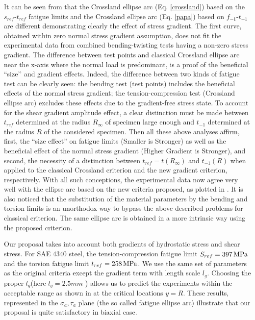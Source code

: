 It can be seen from  that the Crossland ellipse arc (Eq. \ref{crossland}) based on the $s_{ref}$-$ t_{ref}$ fatigue limits and the Crossland ellipse arc (Eq. \ref{papa}) based on $f_{-1}$-$t_{-1}$ are different demonstrating clearly the effect of stress gradient. The first curve, obtained within zero normal stress gradient assumption, does not fit the experimental data from combined bending-twisting tests having a non-zero stress gradient.  The difference between test points and classical Crossland ellipse arc near the x-axis where the normal load is predominant, is a proof of the beneficial ``size’’ and gradient effects. Indeed, the difference between two kinds of fatigue test can be clearly seen: the bending test (test points) includes the beneficial effects of the normal stress gradient; the tension-compression test (Crossland ellipse arc) excludes these effects due to the gradient-free stress state.  To account for the shear gradient amplitude effect, a clear distinction must be made between $t_{ref}$
determined at the radius $R_{\infty}$ of specimen large enough and $t_{-1}$ determined at the radius $R$ of the considered specimen.
Then all these above analyses affirm, first, the ``size effect'' on fatigue limits
(Smaller is Stronger) as well as the beneficial effect of the normal
stress gradient (Higher Gradient is Stronger), and second, the
necessity of a distinction between $t_{ref}=t(R_{\infty})$ and $t_{-1}(R)$ when applied to the classical Crossland criterion and the new gradient criterion, respectively. With all such conceptions, the experimental data now agree very well with the ellipse arc based on  the new criteria proposed, as plotted in . It is also noticed that the substitution of the material parameters by the bending and torsion limits is an unorthodox way to bypass the above described problems for classical criterion. The same ellipse arc is obtained in a more intrinsic way using the proposed criterion.

Our proposal takes into account both gradients of hydrostatic stress and shear stress. For SAE 4340 steel, the tension-compression fatigue limit $S_{ref}=397\,\textnormal{MPa}$ and the torsion fatigue limit $t_{ref}=258\,\textnormal{MPa}$. We use the same set of parameters as the original criteria except the gradient term with length scale $l_g$. Choosing the proper $l_g$(here $l_g=2.5mm$ ) allows us to predict the experiments within the acceptable range as shown in  at the critical locations $y=R$. These results, represented in the $\sigma_a, \tau_a$ plane (the so called fatigue ellipse arc)  illustrate that our proposal is quite satisfactory in biaxial case.	

